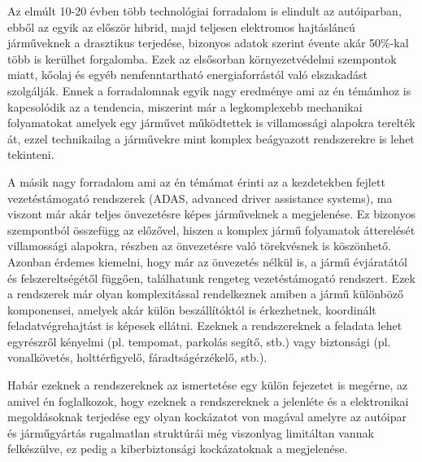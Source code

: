 Az elmúlt 10-20 évben több technológiai forradalom is elindult az autóiparban, ebből az egyik az először hibrid, majd teljesen elektromos hajtásláncú járműveknek a drasztikus terjedése, bizonyos adatok szerint évente akár 50\%-kal több is kerülhet forgalomba. Ezek az elsősorban környezetvédelmi szempontok miatt, kőolaj és egyéb nemfenntartható energiaforrástól való elszakadást szolgálják. Ennek a forradalomnak egyik nagy eredménye ami az én témámhoz is kapcsolódik az a tendencia, miszerint már a legkomplexebb mechanikai folyamatokat amelyek egy járművet működtettek is villamossági alapokra terelték át, ezzel technikailag a járművekre mint komplex beágyazott rendszerekre is lehet tekinteni.



A másik nagy forradalom ami az én témámat érinti az a kezdetekben fejlett vezetéstámogató rendszerek (ADAS, advanced driver assistance systems), ma viszont már akár teljes önvezetésre képes járműveknek a megjelenése. Ez bizonyos szempontból összefügg az előzővel, hiszen a komplex jármű folyamatok átterelését villamossági alapokra, részben az önvezetésre való törekvésnek is köszönhető. Azonban érdemes kiemelni, hogy már az önvezetés nélkül is, a jármű évjáratától és felszereltségétől függően, találhatunk rengeteg vezetéstámogató rendszert. Ezek a rendszerek már olyan komplexitással rendelkeznek amiben a jármű különböző komponensei, amelyek akár külön beszállítóktól is érkezhetnek, koordinált feladatvégrehajtást is képesek ellátni. Ezeknek a rendszereknek a feladata lehet egyrészről kényelmi (pl. tempomat, parkolás segítő, stb.) vagy biztonsági (pl. vonalkövetés, holttérfigyelő, fáradtságérzékelő, stb.).


Habár ezeknek a rendszereknek az ismertetése egy külön fejezetet is megérne, az amivel én foglalkozok, hogy ezeknek a rendszereknek a jelenléte és a elektronikai megoldásoknak terjedése egy olyan kockázatot von magával amelyre az autóipar és járműgyártás rugalmatlan struktúrái még viszonlyag limitáltan vannak felkészülve, ez pedig a kiberbiztonsági kockázatoknak a megjelenése. \\

